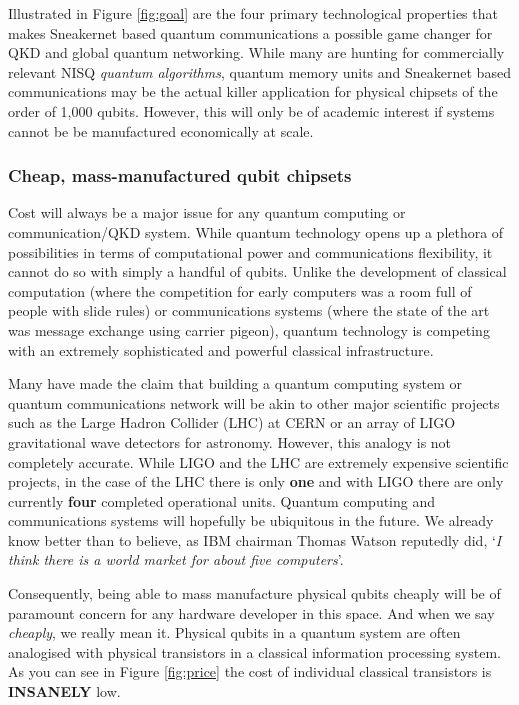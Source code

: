 \documentclass[twocolumn, aps, rmp, amsmath, amssymb, nofootinbib, superscriptaddress, longbibliography, floatfix, table-of-contents, eqsecnum]{revtex4-2}
\begin{document}
Illustrated in Figure \ref{fig:goal} are the four primary technological properties that makes Sneakernet based quantum communications a possible game changer for QKD and global quantum networking. While many are hunting for commercially relevant NISQ \textit{quantum algorithms}, quantum memory units and Sneakernet based communications may be the actual killer application for physical chipsets of the order of 1,000 qubits. However, this will only be of academic interest if systems cannot be be manufactured economically at scale.

\subsubsection{Cheap, mass-manufactured qubit chipsets}

Cost will always be a major issue for any quantum computing or communication/QKD system. While quantum technology opens up a plethora of possibilities in terms of computational power and communications flexibility, it cannot do so with simply a handful of qubits. Unlike the development of classical computation (where the competition for early computers was a room full of people with slide rules) or communications systems (where the state of the art was message exchange using carrier pigeon), quantum technology is competing with an extremely sophisticated and powerful classical infrastructure. 

Many have made the claim that building a quantum computing system or quantum communications network will be akin to other major scientific projects such as the Large Hadron Collider (LHC) at CERN or an array of LIGO gravitational wave detectors for astronomy. However, this analogy is not completely accurate. While LIGO and the LHC are extremely expensive scientific projects, in the case of the LHC there is only \textbf{one} and with LIGO there are only currently \textbf{four} completed operational units. Quantum computing and communications systems will hopefully be ubiquitous in the future. We already know better than to believe, as IBM chairman Thomas Watson reputedly did, `\textit{I think there is a world market for about five computers}'. 

Consequently, being able to mass manufacture physical qubits cheaply will be of paramount concern for any hardware developer in this space. And when we say \textit{cheaply}, we really mean it. Physical qubits in a quantum system are often analogised with physical transistors in a classical information processing system. As you can see in Figure \ref{fig:price} the cost of individual classical transistors is \textbf{INSANELY} low. 
 
\end{document}
